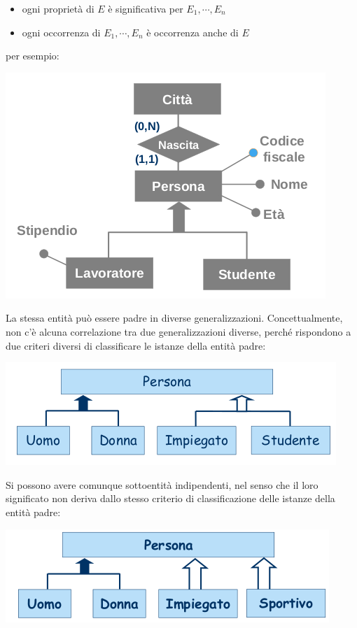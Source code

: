 \documentclass[a4paper,12pt, oneside]{book}
\begin{document}
\begin{itemize}
\item ogni proprietà di $E$ è significativa per $E_1,\cdots, E_n$
\item ogni occorrenza di $E_1,\cdots, E_n$ è occorrenza anche di $E$ 
\end{itemize}
per esempio:
\begin{center}
\includegraphics[scale=0.8]{img/isa5.png}
\end{center}
La stessa entità può essere padre in diverse
generalizzazioni. Concettualmente, non c'è alcuna correlazione tra due generalizzazioni diverse, perché rispondono a due criteri diversi di classificare le istanze della entità padre:
\begin{center}
\includegraphics[scale=0.8]{img/isa6.png}
\end{center}
Si possono avere comunque sottoentità indipendenti, nel senso che il loro significato non deriva dallo stesso
criterio di classificazione delle istanze della entità padre:
\begin{center}
\includegraphics[scale=0.8]{img/isa7.png}
\end{center}
\end{document}
